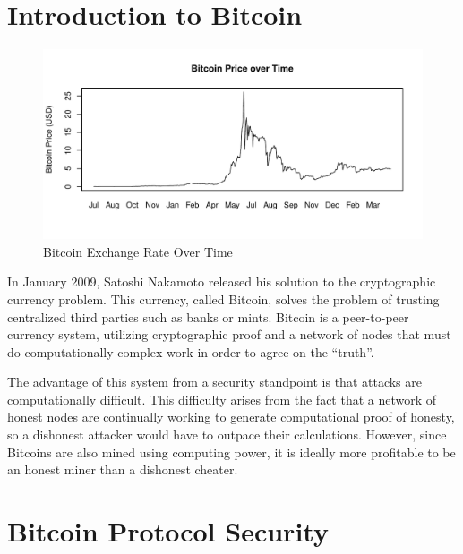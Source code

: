 \documentclass{report}
\begin{document}
\section*{Introduction to Bitcoin}
\begin{figure}[h]
\begin{center}
\includegraphics[width=\textwidth]{images/bitcoin_v_time.pdf}
\caption{Bitcoin Exchange Rate Over Time}
\label{fig:bitcoinvalue}
\end{center}
\end{figure}
In January 2009\cite{wiki:bitcoin}, Satoshi Nakamoto released his solution to the cryptographic currency problem. This currency, called Bitcoin, solves the problem of trusting centralized third parties such as banks or mints. Bitcoin is a peer-to-peer currency system, utilizing cryptographic proof and a network of nodes that must do computationally complex work in order to agree on the ``truth''\cite{Nakamoto:Bitcoin}.

The advantage of this system from a security standpoint is that attacks are computationally difficult. This difficulty arises from the fact that a network of honest nodes are continually working to generate computational proof of honesty, so a dishonest attacker would have to outpace their calculations. However, since Bitcoins are also mined using computing power, it is ideally more profitable to be an honest miner than a dishonest cheater.




\section*{Bitcoin Protocol Security}
\end{document}
